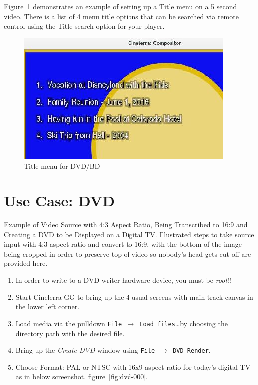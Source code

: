 Figure~\ref{fig:dvd-title} demonstrates  an example of setting up a Title menu on a 5 second video.  There is a list of 4 menu title options that can be searched via remote control using the Title search option for your player.

\begin{figure}[htpb]
    \centering
    \includegraphics[width=0.8\linewidth]{images/dvd-title.png}
    \caption{Title menu for DVD/BD}
    \label{fig:dvd-title}
\end{figure}

\section{Use Case: DVD}%
\label{sec:use_case_dvd}

Example of Video Source with 4:3 Aspect Ratio, Being Transcribed to 16:9 and Creating a DVD to be Displayed on a Digital TV. Illustrated steps to take source input with 4:3 aspect ratio and convert to 16:9, with the bottom of the image being cropped in order to preserve top of video so nobody's head gets cut off are provided here.

\begin{enumerate}
    \item In order to write to a DVD writer hardware device, you must be \textit{root}!!
    \item Start Cinelerra-GG to bring up the 4 usual screens with main track canvas in the lower left corner.
    \item Load media via the pulldown \texttt{File $\rightarrow$ Load files}\dots by choosing the directory path with the desired file.
    \item Bring up the \textit{Create DVD} window using \texttt{File $\rightarrow$ DVD Render}. 
    \item Choose Format: PAL or NTSC with 16x9 aspect ratio for today's digital TV as in below screenshot. figure~\ref{fig:dvd-000}.
\end{enumerate}

